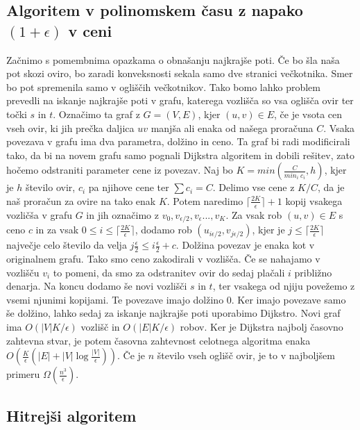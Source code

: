 \documentclass{article}
\begin{document}
\subsection*{Algoritem v polinomskem času z napako $(1+\epsilon)$ v ceni}

Začnimo s pomembnima opazkama o obnašanju najkrajše poti. Če bo šla naša pot skozi oviro, bo zaradi konveksnosti sekala samo dve stranici večkotnika. Smer bo pot spremenila samo v ogliščih večkotnikov. Tako bomo lahko problem prevedli na iskanje najkrajše poti v grafu, katerega vozlišča so vsa oglišča ovir ter točki $s$ in $t$. Označimo ta graf z $G = (V, E)$, kjer $(u,v) \in E$, če je vsota cen vseh ovir, ki jih prečka daljica $uv$ manjša ali enaka od našega proračuna $C$. Vsaka povezava v grafu ima dva parametra, dolžino in ceno. Ta graf bi radi modificirali tako, da bi na novem grafu samo pognali Dijkstra algoritem in dobili rešitev, zato hočemo odstraniti parameter cene iz povezav. 
Naj bo  $K = min(\frac{C}{min_i \ c_i}, h)$, kjer je $h$ število ovir, $c_i$ pa njihove cene ter $\sum c_i = C$. Delimo vse cene z $K/C$, da je naš proračun za ovire na tako enak $K$. Potem naredimo $ \lceil{\frac{2K}{\epsilon}}\rceil + 1$  kopij vsakega vozličša v grafu $G$ in jih označimo z $v_0, v_{\epsilon/2}, v_{\epsilon}..., v_K$. Za vsak rob $(u, v) \in E$ s ceno $c$ in za vsak $0 \le i \le \lceil{\frac{2K}{\epsilon}}\rceil $, dodamo rob $(u_{i \epsilon/2}, v_{j \epsilon/2})$, kjer je $j\le\lceil{\frac{2K}{\epsilon}}\rceil$ največje celo število da velja $j\frac{\epsilon}{2}
 \le i \frac{\epsilon}{2} + c$. Dolžina povezav je enaka kot v originalnem grafu. Tako smo ceno zakodirali v vozlišča. Če se nahajamo v vozlišču $v_i$ to pomeni, da smo za odstranitev ovir do sedaj plačali $i$ približno denarja. Na koncu dodamo še novi vozlišči $s$ in $t$, ter vsakega od njiju povežemo z vsemi njunimi kopijami. Te povezave imajo dolžino $0$. Ker imajo povezave samo še dolžino, lahko sedaj za iskanje najkrajše poti uporabimo Dijkstro. Novi graf ima $O(|V|K/\epsilon)$ vozlišč in $O(|E|K/\epsilon)$ robov. Ker je Dijkstra najbolj časovno zahtevna stvar, je potem časovna zahtevnost celotnega algoritma enaka $O(\frac{K}{\epsilon}(|E| + |V|\log\frac{|V|}{\epsilon}) )$. Če je $n$ število vseh oglišč ovir, je to v najboljšem primeru $\Omega(\frac{n^3}{\epsilon})$.

\subsection*{Hitrejši algoritem}
\end{document}
